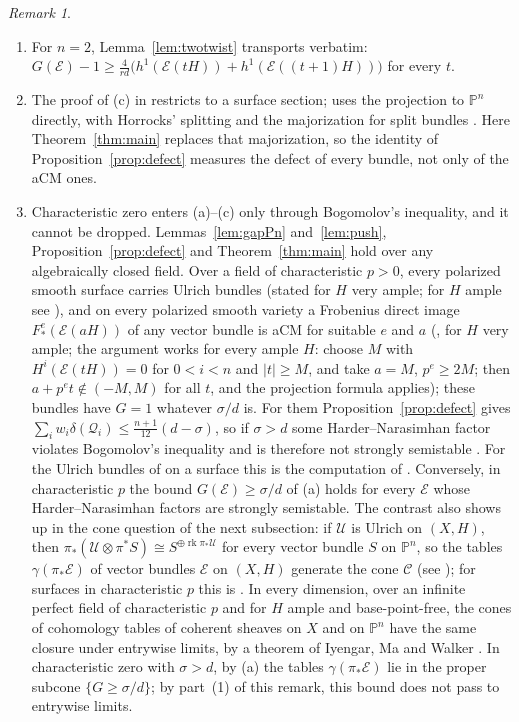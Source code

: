 \documentclass[11pt]{amsart}
\theoremstyle{definition}
\theoremstyle{remark}
\newtheorem{remark}[theorem]{Remark}
\newcommand{\PP}{\mathbb{P}}
\newcommand{\cE}{\mathcal{E}}
\newcommand{\cQ}{\mathcal{Q}}
\newcommand{\cU}{\mathcal{U}}
\newcommand{\CC}{\mathcal{C}}
\DeclareMathOperator{\rk}{rk}
\begin{document}
\begin{remark}
\begin{enumerate}[label=(\arabic*)]
\item For $n=2$, Lemma~\ref{lem:twotwist} transports verbatim: $G(\cE)-1\ge\frac4{rd}\big(h^1(\cE(tH))+h^1(\cE((t+1)H))\big)$ for every $t$.
\item The proof of (c) in \cite[Prop.~5.1]{An2} restricts to a surface section; \cite[\S10.7]{An3} uses the projection to $\PP^n$ directly, with Horrocks' splitting and the majorization for split bundles \cite[Lemma~10.8]{An3}. Here Theorem~\ref{thm:main} replaces that majorization, so the identity of Proposition~\ref{prop:defect} measures the defect of every bundle, not only of the aCM ones.
\item Characteristic zero enters (a)--(c) only through Bogomolov's inequality, and it cannot be dropped. Lemmas~\ref{lem:gapPn} and~\ref{lem:push}, Proposition~\ref{prop:defect} and Theorem~\ref{thm:main} hold over any algebraically closed field. Over a field of characteristic $p>0$, every polarized smooth surface carries Ulrich bundles \cite[Thm.~1.1]{Pi26a} (stated for $H$ very ample; for $H$ ample see \cite[Lemma~2.11]{Pi26a}), and on every polarized smooth variety a Frobenius direct image $F^e_*(\cE(aH))$ of any vector bundle is aCM for suitable $e$ and $a$ (\cite[Prop.~4.11]{Pi26b}, for $H$ very ample; the argument works for every ample $H$: choose $M$ with $H^i(\cE(tH))=0$ for $0<i<n$ and $|t|\ge M$, and take $a=M$, $p^e\ge2M$; then $a+p^et\notin(-M,M)$ for all $t$, and the projection formula applies); these bundles have $G=1$ whatever $\sigma/d$ is. For them Proposition~\ref{prop:defect} gives $\sum_iw_i\delta(\cQ_i)\le\frac{n+1}{12}(d-\sigma)$, so if $\sigma>d$ some Harder--Narasimhan factor violates Bogomolov's inequality and is therefore not strongly semistable \cite{La04}. For the Ulrich bundles of \cite{Pi26a} on a surface this is the computation of \cite[Rem.~2.9]{Pi26a}. Conversely, in characteristic $p$ the bound $G(\cE)\ge\sigma/d$ of (a) holds for every $\cE$ whose Harder--Narasimhan factors are strongly semistable. The contrast also shows up in the cone question of the next subsection: if $\cU$ is Ulrich on $(X,H)$, then $\pi_*(\cU\otimes\pi^*S)\cong S^{\oplus\rk\pi_*\cU}$ for every vector bundle $S$ on $\PP^n$, so the tables $\gamma(\pi_*\cE)$ of vector bundles $\cE$ on $(X,H)$ generate the cone $\CC$ (see \cite[Thm.~5.3]{ESi}); for surfaces in characteristic $p$ this is \cite[Cor.~1.2]{Pi26a}. In every dimension, over an infinite perfect field of characteristic $p$ and for $H$ ample and base-point-free, the cones of cohomology tables of coherent sheaves on $X$ and on $\PP^n$ have the same closure under entrywise limits, by a theorem of Iyengar, Ma and Walker \cite[Thm.~3.4]{IMW23}. In characteristic zero with $\sigma>d$, by (a) the tables $\gamma(\pi_*\cE)$ lie in the proper subcone $\{G\ge\sigma/d\}$; by part~(1) of this remark, this bound does not pass to entrywise limits.
\end{enumerate}
\end{remark}
\end{document}
